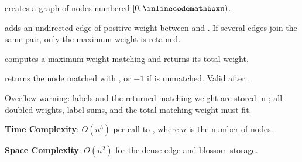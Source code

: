 \begin{compactitem}
  \item {} creates a graph of  nodes numbered $[0, {\inlinecodemath{n}})$.
  \item {} adds an undirected edge of positive weight  between  and . If several edges join the same pair, only the maximum weight is retained.
  \item {} computes a maximum-weight matching and returns its total weight.
  \item {} returns the node matched with , or $-1$ if  is unmatched. Valid after .
\end{compactitem}

Overflow warning: labels and the returned matching weight are stored in ; all doubled weights, label sums, and the total matching weight must fit.

\textbf{Time Complexity}: $O(n^{3})$ per call to , where $n$ is the number of nodes.

\textbf{Space Complexity}: $O(n^{2})$ for the dense edge and blossom storage.

